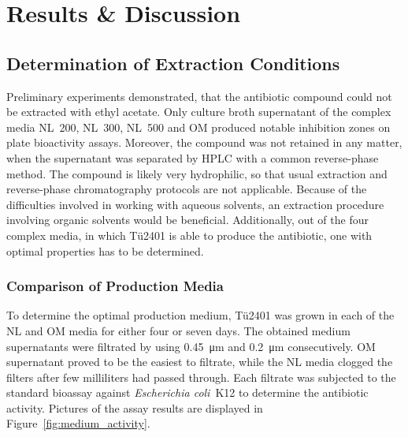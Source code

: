 \chapter{Results \& Discussion}

\section{Determination of Extraction Conditions} %
\label{sec:determination_of_extraction_conditions}

	Preliminary experiments demonstrated, that the antibiotic compound could not be extracted with ethyl acetate.
	Only culture broth supernatant of the complex media NL~200, NL~300, NL~500 and OM produced notable inhibition zones on plate bioactivity assays.
	Moreover, the compound was not retained in any matter, when the supernatant was separated by HPLC with a common reverse-phase method.
	The compound is likely very hydrophilic, so that usual extraction and reverse-phase chromatography protocols are not applicable.
	Because of the difficulties involved in working with aqueous solvents, an extraction procedure involving organic solvents would be beneficial.
	Additionally, out of the four complex media, in which Tü2401 is able to produce the antibiotic, one with optimal properties has to be determined.

\subsection{Comparison of Production Media} %
\label{sub:comparison_of_production_media}

	To determine the optimal production medium, Tü2401 was grown in each of the NL and OM media for either four or seven days.
	The obtained medium supernatants were filtrated by using \SI{0.45}{\micro\meter} and \SI{0.2}{\micro\meter} consecutively.
	OM supernatant proved to be the easiest to filtrate, while the NL media clogged the filters after few milliliters had passed through.
	Each filtrate was subjected to the standard bioassay against \textit{Escherichia coli}~K12 to determine the antibiotic activity.
	Pictures of the assay results are displayed in Figure~\ref{fig:medium_activity}.
	
